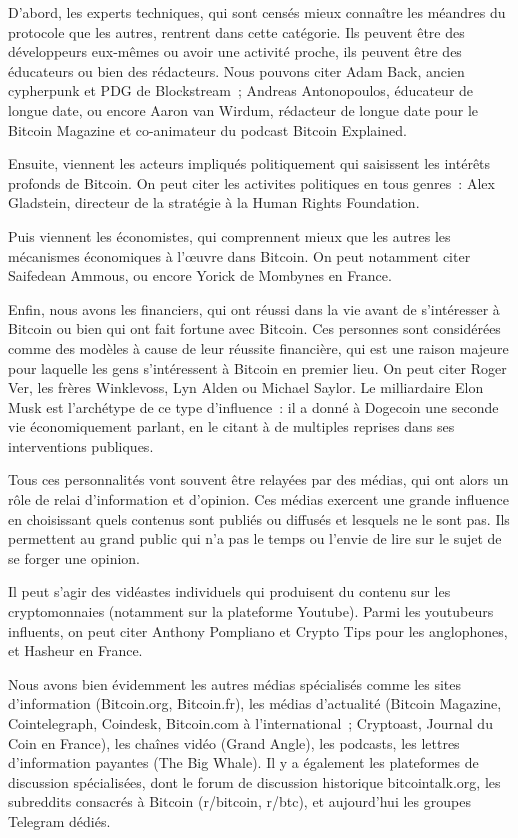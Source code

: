 D'abord, les experts techniques, qui sont censés mieux connaître les méandres du protocole que les autres, rentrent dans cette catégorie. Ils peuvent être des développeurs eux-mêmes ou avoir une activité proche, ils peuvent être des éducateurs ou bien des rédacteurs. Nous pouvons citer Adam Back, ancien cypherpunk et PDG de Blockstream~; Andreas Antonopoulos, éducateur de longue date, ou encore Aaron van Wirdum, rédacteur de longue date pour le Bitcoin Magazine et co-animateur du podcast Bitcoin Explained.

Ensuite, viennent les acteurs impliqués politiquement qui saisissent les intérêts profonds de Bitcoin. On peut citer les activites politiques en tous genres~: Alex Gladstein, directeur de la stratégie à la Human Rights Foundation.

Puis viennent les économistes, qui comprennent mieux que les autres les mécanismes économiques à l'œuvre dans Bitcoin. On peut notamment citer Saifedean Ammous, ou encore Yorick de Mombynes en France.

Enfin, nous avons les financiers, qui ont réussi dans la vie avant de s'intéresser à Bitcoin ou bien qui ont fait fortune avec Bitcoin. Ces personnes sont considérées comme des modèles à cause de leur réussite financière, qui est une raison majeure pour laquelle les gens s'intéressent à Bitcoin en premier lieu. On peut citer Roger Ver, les frères Winklevoss, Lyn Alden ou Michael Saylor. Le milliardaire Elon Musk est l'archétype de ce type d'influence~: il a donné à Dogecoin une seconde vie économiquement parlant, en le citant à de multiples reprises dans ses interventions publiques.

Tous ces personnalités vont souvent être relayées par des médias, qui ont alors un rôle de relai d'information et d'opinion. Ces médias exercent une grande influence en choisissant quels contenus sont publiés ou diffusés et lesquels ne le sont pas. Ils permettent au grand public qui n'a pas le temps ou l'envie de lire sur le sujet de se forger une opinion.

Il peut s'agir des vidéastes individuels qui produisent du contenu sur les cryptomonnaies (notamment sur la plateforme Youtube). Parmi les youtubeurs influents, on peut citer Anthony Pompliano et Crypto Tips pour les anglophones, et Hasheur en France.

Nous avons bien évidemment les autres médias spécialisés comme les sites d'information (Bitcoin.org, Bitcoin.fr), les médias d'actualité (Bitcoin Magazine, Cointelegraph, Coindesk, Bitcoin.com à l'international~; Cryptoast, Journal du Coin en France), les chaînes vidéo (Grand Angle), les podcasts, les lettres d'information payantes (The Big Whale). Il y a également les plateformes de discussion spécialisées, dont le forum de discussion historique bitcointalk.org, les subreddits consacrés à Bitcoin (r/bitcoin, r/btc), et aujourd'hui les groupes Telegram dédiés.

